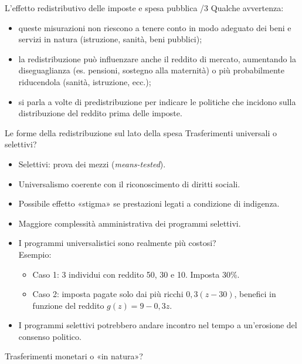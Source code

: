 \documentclass[aspectratio=64,12pt]{beamer}
\begin{document}
\begin{frame}{L'effetto redistributivo delle imposte e spesa pubblica /3}
Qualche avvertenza:
\begin{itemize}
\item queste misurazioni non riescono a tenere conto in modo adeguato dei beni e servizi in natura (istruzione, sanità, beni pubblici);
\item la redistribuzione può influenzare anche il reddito di mercato, aumentando la diseguaglianza (es. pensioni, sostegno alla maternità) o più probabilmente riducendola (sanità, istruzione, ecc.);
\item si parla a volte di \alert{predistribuzione} per indicare le politiche che incidono sulla distribuzione del reddito prima delle imposte.
\end{itemize}
\end{frame}

\begin{frame}{Le forme della redistribuzione sul lato della spesa}
Trasferimenti universali o selettivi?
\begin{itemize}
\item Selettivi: prova dei mezzi (\emph{means-tested}).
\item Universalismo coerente con il riconoscimento di diritti sociali.
\item Possibile effetto «stigma» se prestazioni legati a condizione di indigenza.
\item Maggiore complessità amministrativa dei programmi selettivi.
\item I programmi universalistici sono realmente più costosi?\\[0pt]
Esempio:
\begin{itemize}
\item Caso 1: 3 individui con reddito 50, 30 e 10. Imposta 30\%.
\item Caso 2: imposta pagate solo dai più ricchi $0,3(z-30)$, benefici in funzione del reddito $g(z)=9-0,3z$.
\end{itemize}
\item I programmi selettivi potrebbero andare incontro nel tempo a un'erosione
del consenso politico.
\end{itemize}
Trasferimenti monetari o «in natura»?
\end{frame}
\end{document}
